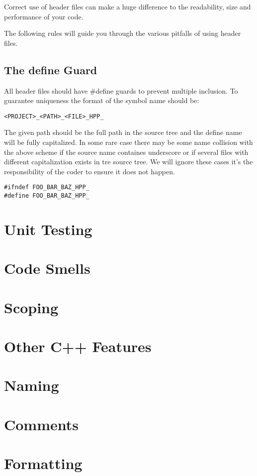 \documentclass[11pt]{report}
\begin{document}
Correct use of header files can make a huge difference to the readability, size and performance of your code.

The following rules will guide you through the various pitfalls of using header files. 

\section{The define Guard}

All header files should have \#define guards to prevent multiple inclusion. To guarantee uniqueness the format of the symbol name should be:
\vspace{5pt}
\begin{lstlisting}[frame=none]
<PROJECT>_<PATH>_<FILE>_HPP_
\end{lstlisting}
\vspace{-20pt}
 \lstinline{}

The given path should be the full path in the source tree and the define name will be fully capitalized. In some rare case there may be some name collision with the above scheme if the source name containes underscore or if several files with different capitalization exists in tre source tree. We will ignore these cases it's the responsibility of the coder to ensure it does not happen.

\vspace{5pt}
\begin{lstlisting}
#ifndef FOO_BAR_BAZ_HPP_
#define FOO_BAR_BAZ_HPP_
\end{lstlisting}
\vspace{-20pt}

\chapter{Unit Testing}

\chapter{Code Smells}

\chapter{Scoping}

\chapter{Other C++ Features}

\chapter{Naming}

\chapter{Comments}

\chapter{Formatting}
\end{document}

